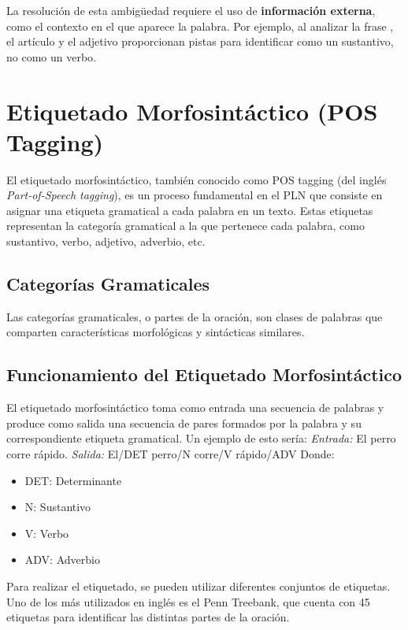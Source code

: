 \documentclass{report}
\def\profundidadIndiceCapitulo{subsubsection}
\begin{document}
La resolución de esta ambigüedad requiere el uso de \textbf{información externa}, como el contexto en el que aparece la palabra. Por ejemplo, al analizar la frase , el artículo  y el adjetivo  proporcionan pistas para identificar  como un sustantivo, no como un verbo.

\chapter{Etiquetado Morfosintáctico (POS Tagging)}
\etocframedstyle[1]{}
\etocsetnexttocdepth{\profundidadIndiceCapitulo}
\localtableofcontents
El etiquetado morfosintáctico, también conocido como POS tagging (del inglés \emph{Part-of-Speech tagging}), es un proceso fundamental en el PLN que consiste en asignar una etiqueta gramatical a cada palabra en un texto.  Estas etiquetas representan la categoría gramatical a la que pertenece cada palabra, como sustantivo, verbo, adjetivo, adverbio, etc.
\section{Categorías Gramaticales}
Las categorías gramaticales, o partes de la oración, son clases de palabras que comparten características morfológicas y sintácticas similares.

\section{Funcionamiento del Etiquetado Morfosintáctico}
El etiquetado morfosintáctico toma como entrada una secuencia de palabras y produce como salida una secuencia de pares formados por la palabra y su correspondiente etiqueta gramatical.
Un ejemplo de esto sería:
\emph{Entrada:} El perro corre rápido.
\emph{Salida:} El/DET perro/N corre/V rápido/ADV
Donde:
\begin{itemize} \item DET: Determinante \item N: Sustantivo \item V: Verbo \item ADV: Adverbio \end{itemize}
Para realizar el etiquetado, se pueden utilizar diferentes conjuntos de etiquetas. Uno de los más utilizados en inglés es el Penn Treebank, que cuenta con 45 etiquetas para identificar las distintas partes de la oración.
\end{document}
